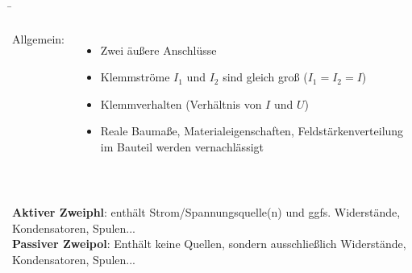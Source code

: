 \begin{frame}
	\b{
	
		\begin{columns}
			
			Allgemein:\\
			\phantom{.}\\
			\begin{itemize}
				\item Zwei äußere Anschlüsse
				\item Klemmströme $I_1$ und $I_2$ sind gleich groß ($I_1=I_2 = I$)
				\item Klemmverhalten (Verhältnis von $I$ und $U$)
				\item Reale Baumaße, Materialeigenschaften, Feldstärkenverteilung im Bauteil werden vernachlässigt
			\end{itemize}
			
			
			\vspace{10pt}
			
			
			
		\end{columns}
		
		\phantom{text}\\
		
		
		\textbf{Aktiver Zweiphl}: enthält Strom/Spannungsquelle(n) und ggfs. Widerstände, Kondensatoren, Spulen...\\
		
		
		\textbf{Passiver Zweipol}: Enthält keine Quellen, sondern ausschließlich Widerstände, Kondensatoren, Spulen...
		
		\begin{columns}
			\column[t]{0.6\textwidth}
			
			\column[t]{0.4\textwidth}
		\end{columns}
		
}
\end{frame}

